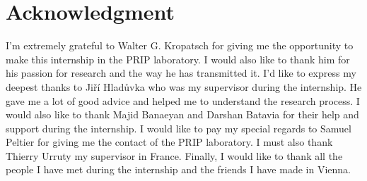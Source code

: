 \cleardoublepage
{}
{}
\chapter*{Acknowledgment}
\vspace{1.0in}

I'm extremely grateful to Walter G. Kropatsch for giving me the opportunity to make this
internship in the PRIP laboratory. I would also like to thank him for his passion for 
research and the way he has transmitted it. I'd like to express my deepest thanks to
Jiří Hladůvka who was my supervisor during the internship. He gave me a lot of good
advice and helped me to understand the research process. I would also like to thank
Majid Banaeyan and Darshan Batavia for their help and support during the internship.
I would like to pay my special regards to Samuel Peltier for giving me the contact
of the PRIP laboratory. I must also thank Thierry Urruty my supervisor in France.
Finally, I would like to thank all the people I have met during the internship and
the friends I have made in Vienna.

\newpage
